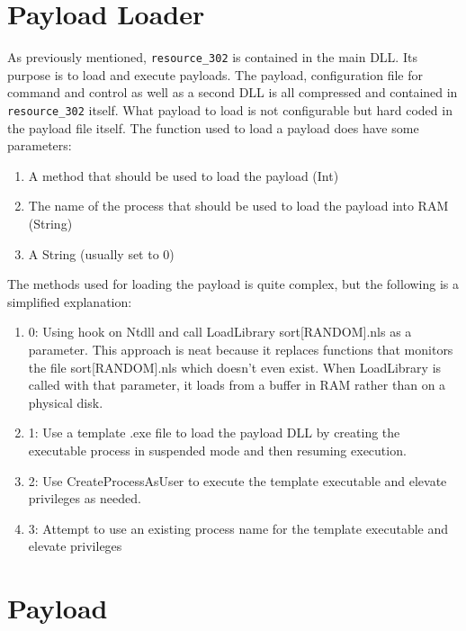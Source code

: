 \documentclass[11pt,english,a4paper]{report}
\begin{document}
\section{Payload Loader}
As previously mentioned, \texttt{resource\_302} is contained in the main DLL. Its purpose is to load and execute payloads. The payload, configuration file for command and control as well as a second DLL is all compressed and contained in \texttt{resource\_302} itself. What payload to load is not configurable but hard coded in the payload file itself. The function used to load a payload does have some parameters:
 \begin{enumerate}
   \item A method that should be used to load the payload (Int)
   \item The name of the process that should be used to load the payload into RAM (String)
   \item A String (usually set to 0)
  \end{enumerate}
The methods used for loading the payload is quite complex, but the following is a simplified explanation:
  \begin{enumerate}
    \item 0: Using hook on Ntdll and call LoadLibrary sort[RANDOM].nls as a parameter. This approach is neat because it replaces functions that monitors the file sort[RANDOM].nls which doesn't even exist. When LoadLibrary is called with that parameter, it loads from a buffer in RAM rather than on a physical disk.
    \item 1: Use a template .exe file to load the payload DLL by creating the executable process in suspended mode and then resuming execution.
    \item 2: Use CreateProcessAsUser to execute the template executable and elevate privileges as needed.
    \item 3: Attempt to use an existing process name for the template executable and elevate privileges
  \end{enumerate}

\section{Payload}
\end{document}
